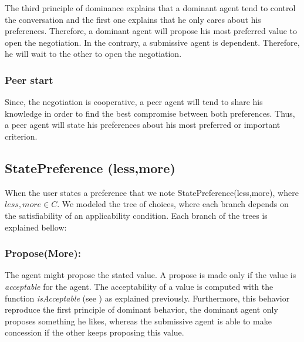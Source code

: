 \documentclass{llncs}
\begin{document}
The third principle of dominance explains that a dominant agent tend to control the conversation and the first one explains that he only cares about his preferences. Therefore, a dominant agent will propose his most preferred value to open the negotiation. In the contrary, a submissive agent is dependent. Therefore, he will wait to the other to open the negotiation.

\subsubsection{Peer start} Since, the negotiation is cooperative, a peer agent will tend to share his knowledge in order to find 
the best compromise between both preferences. Thus, a peer agent will state his preferences about his most preferred or important criterion.
\subsection{StatePreference (less,more)}
When the user states a preference that we note StatePreference(less,more), where $less, more \in C$.  We modeled the tree of choices, where each branch depends on the satisfiability of an applicability condition. Each branch of the trees is explained bellow:
 		\subsubsection{Propose(More):} The agent might propose the stated value. A propose is made only if the value is \emph{acceptable} for the agent. The acceptability of a value is computed with the function \emph{isAcceptable} (see ) as explained previously. Furthermore, this behavior reproduce the first principle of dominant behavior, the dominant agent only proposes something he likes, whereas the submissive agent is able to make concession if the other keeps proposing this value. 
 		
\end{document}
